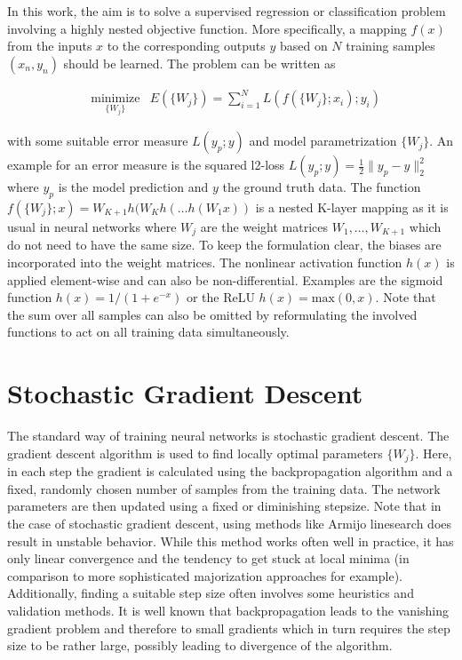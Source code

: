 \documentclass[english,11pt,a4paper]{article}
\begin{document}
In this work, the aim is to solve a supervised regression or classification problem involving a highly nested objective function. More specifically, a mapping $f(x)$ from the inputs $x$ to the corresponding outputs $y$ based on $N$ training samples $(x_n, y_n)$ should be learned. The problem can be written as

\begin{equation}
	\begin{aligned}
		& \underset{\{W_j\}}{\text{minimize}}
		& E(\{W_j\}) = \sum_{i=1}^{N} L(f(\{W_j\};x_i);y_i)
	\end{aligned}
	\label{eq:basis}
\end{equation}

with some suitable error measure $L(y_p;y)$ and model parametrization $\{W_j\}$. An example for an error measure is the squared l2-loss $L(y_p;y) = \frac{1}{2} \| y_p - y \|^2_2$ where $y_p$ is the model prediction and $y$ the ground truth data. The function $f(\{W_j\};x) = W_{K+1}h(W_Kh(\dots h(W_1x))$ is a nested K-layer mapping as it is usual in neural networks where $W_j$ are the weight matrices $W_1,\dots,W_{K+1}$ which do not need to have the same size. To keep the formulation clear, the biases are incorporated into the weight matrices. The nonlinear activation function $h(x)$ is applied element-wise and can also be non-differential. Examples are the sigmoid function $h(x) = 1/(1 + e^{-x})$ or the ReLU $h(x) = \mathrm{max}(0, x)$. Note that the sum over all samples can also be omitted by reformulating the involved functions to act on all training data simultaneously.

\section{Stochastic Gradient Descent}

The standard way of training neural networks is stochastic gradient descent. The gradient descent algorithm is used to find locally optimal parameters $\{W_j\}$. Here, in each step the gradient is calculated using the backpropagation algorithm and a fixed, randomly chosen number of samples from the training data. The network parameters are then updated using a fixed or diminishing stepsize. Note that in the case of stochastic gradient descent, using methods like Armijo linesearch does result in unstable behavior. While this method works often well in practice, it has only linear convergence and the tendency to get stuck at local minima (in comparison to more sophisticated majorization approaches for example). Additionally, finding a suitable step size often involves some heuristics and validation methods. It is well known that backpropagation leads to the vanishing gradient problem and therefore to small gradients which in turn requires the step size to be rather large, possibly leading to divergence of the algorithm.
\end{document}
